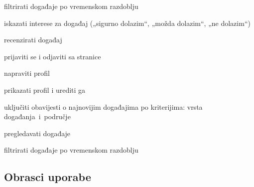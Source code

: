 \begin{packed_enum}
\begin{packed_enum}
\begin{packed_enum}
					\item  filtrirati događaje po vremenskom razdoblju
	
					\end{packed_enum}
					
				\end{packed_enum}
					
				\item  {}
					
					\begin{packed_enum}
					\item iskazati interese za događaj („sigurno dolazim“, „možda dolazim“, „ne dolazim“)
					\item recenzirati događaj	
					\item prijaviti se i odjaviti sa stranice
					\item napraviti profil
					\item prikazati profil i urediti ga
					\item uključiti obavijesti o najnovijim događajima po kriterijima: vrsta događanja i područje
					\item pregledavati događaje
					\begin{packed_enum}
	
						\item  filtrirati događaje po vremenskom razdoblju
	
					\end{packed_enum}
															
					\end{packed_enum}
												
			\end{packed_enum}
			
	
			\eject 
			
			
				
			\subsection{Obrasci uporabe}
							

